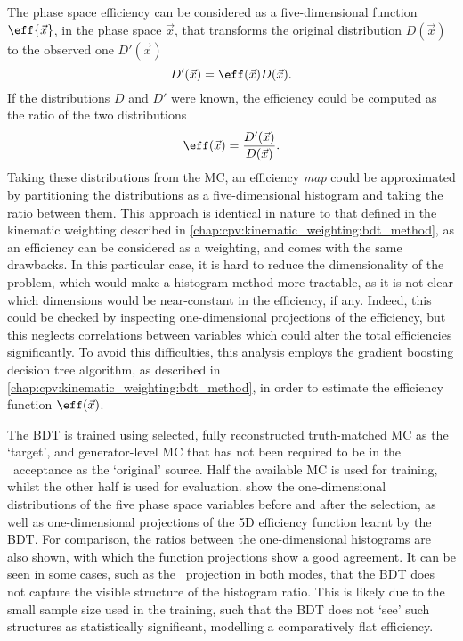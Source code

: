 The phase space efficiency can be considered as a five-dimensional function 
$\eff{\vec{x}}$, in the phase space $\vec{x}$, that transforms the original 
distribution $D(\vec{x})$ to the observed one $D'(\vec{x})$
\begin{equation}
  D'(\vec{x}) = \eff(\vec{x})D(\vec{x}).
\end{equation}
If the distributions $D$ and $D'$ were known, the efficiency could be computed 
as the ratio of the two distributions
\begin{equation}
  \eff(\vec{x}) = \frac{D'(\vec{x})}{D(\vec{x})}.
\end{equation}
Taking these distributions from the \ac{MC}, an efficiency \emph{map} could be 
approximated by partitioning the distributions as a five-dimensional histogram 
and taking the ratio between them.
This approach is identical in nature to that defined in the kinematic weighting 
described in \cref{chap:cpv:kinematic_weighting:bdt_method}, as an efficiency 
can be considered as a weighting, and comes with the same drawbacks.
In this particular case, it is hard to reduce the dimensionality of the 
problem, which would make a histogram method more tractable, as it is not clear 
which dimensions would be near-constant in the efficiency, if any.
Indeed, this could be checked by inspecting one-dimensional projections of the 
efficiency, but this neglects correlations between variables which could alter 
the total efficiencies significantly.
To avoid this difficulties, this analysis employs the gradient boosting 
decision tree algorithm, as described in 
\cref{chap:cpv:kinematic_weighting:bdt_method}, in order to estimate the 
efficiency function $\eff(\vec{x})$.

The \ac{BDT} is trained using selected, fully reconstructed truth-matched 
\ac{MC} as the `target', and generator-level \ac{MC} that has not been required 
to be in the \lhcb\ acceptance as the `original' source.
Half the available \ac{MC} is used for training, whilst the other half is used 
for evaluation.
 show the one-dimensional 
distributions of the five phase space variables before and after the selection, 
as well as one-dimensional projections of the 5D efficiency function learnt by 
the \ac{BDT}.
For comparison, the ratios between the one-dimensional histograms are also 
shown, with which the function projections show a good agreement.
It can be seen in some cases, such as the \phihh\ projection in both modes, 
that the \ac{BDT} does not capture the visible structure of the histogram 
ratio.
This is likely due to the small sample size used in the training, such that the 
\ac{BDT} does not `see' such structures as statistically significant, modelling 
a comparatively flat efficiency.


